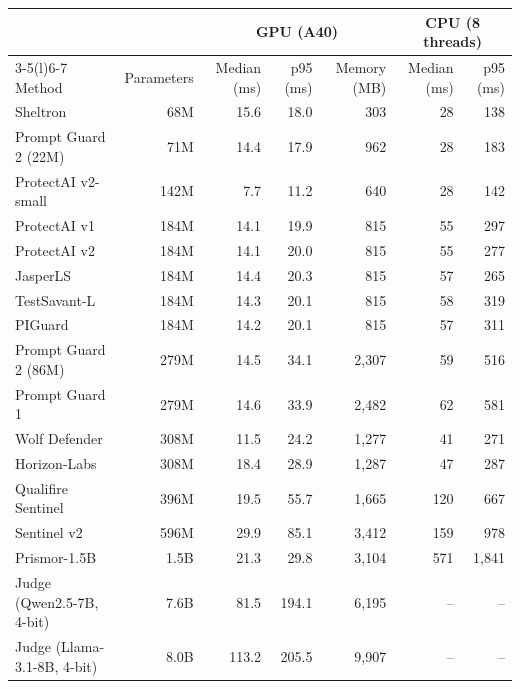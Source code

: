 \begin{tabular*}{\textwidth}{@{\extracolsep{\fill}}lrrrrrr@{}}
\toprule
 & & \multicolumn{3}{c}{GPU (A40)} & \multicolumn{2}{c}{CPU (8 threads)} \\
\cmidrule(lr){3-5}\cmidrule(l){6-7}
Method & Parameters & Median (ms) & p95 (ms) & Memory (MB) & Median (ms) & p95 (ms) \\
\midrule
Sheltron & 68M & 15.6 & 18.0 & 303 & 28 & 138 \\
Prompt Guard 2 (22M) & 71M & 14.4 & 17.9 & 962 & 28 & 183 \\
ProtectAI v2-small & 142M & 7.7 & 11.2 & 640 & 28 & 142 \\
ProtectAI v1 & 184M & 14.1 & 19.9 & 815 & 55 & 297 \\
ProtectAI v2 & 184M & 14.1 & 20.0 & 815 & 55 & 277 \\
JasperLS & 184M & 14.4 & 20.3 & 815 & 57 & 265 \\
TestSavant-L & 184M & 14.3 & 20.1 & 815 & 58 & 319 \\
PIGuard & 184M & 14.2 & 20.1 & 815 & 57 & 311 \\
Prompt Guard 2 (86M) & 279M & 14.5 & 34.1 & 2{,}307 & 59 & 516 \\
Prompt Guard 1 & 279M & 14.6 & 33.9 & 2{,}482 & 62 & 581 \\
Wolf Defender & 308M & 11.5 & 24.2 & 1{,}277 & 41 & 271 \\
Horizon-Labs & 308M & 18.4 & 28.9 & 1{,}287 & 47 & 287 \\
Qualifire Sentinel & 396M & 19.5 & 55.7 & 1{,}665 & 120 & 667 \\
Sentinel v2 & 596M & 29.9 & 85.1 & 3{,}412 & 159 & 978 \\
Prismor-1.5B & 1.5B & 21.3 & 29.8 & 3{,}104 & 571 & 1{,}841 \\
\midrule
Judge (Qwen2.5-7B{,} 4-bit) & 7.6B & 81.5 & 194.1 & 6{,}195 & -- & -- \\
Judge (Llama-3.1-8B{,} 4-bit) & 8.0B & 113.2 & 205.5 & 9{,}907 & -- & -- \\
\bottomrule
\end{tabular*}
